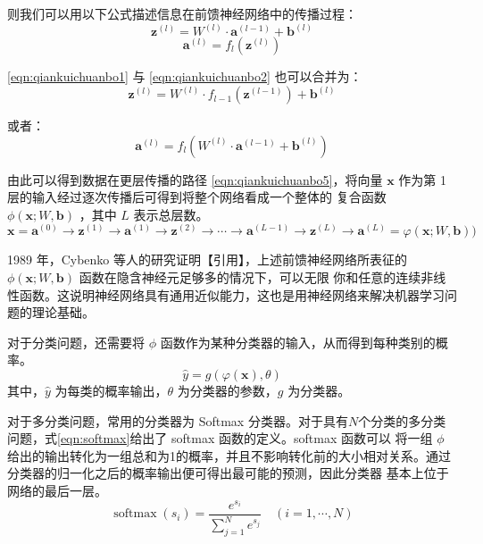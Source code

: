 则我们可以用以下公式描述信息在前馈神经网络中的传播过程：
\begin{equation}
	\label{eqn:qiankuichuanbo1}
	\mathbf { z } ^ { ( l ) } = W ^ { ( l ) } \cdot \mathbf { a } ^ { ( l - 1 ) } + \mathbf { b } ^ { ( l ) }
\end{equation}
\begin{equation}
	\label{eqn:qiankuichuanbo2}
	\mathbf { a } ^ { ( l ) } = f _ { l } \left( \mathbf { z } ^ { ( l ) } \right)
\end{equation}

\ref{eqn:qiankuichuanbo1} 与 \ref{eqn:qiankuichuanbo2} 也可以合并为：
\begin{equation}
	\label{eqn:qiankuichuanbo3}
	\mathbf { z } ^ { ( l ) } = W ^ { ( l ) } \cdot f _ { l - 1 } \left( \mathbf { z } ^ { ( l - 1 ) } \right) + \mathbf { b } ^ { ( l ) }
\end{equation}

或者：
\begin{equation}
	\label{eqn:qiankuichuanbo4}
	\mathbf { a } ^ { ( l ) } = f _ { l } \left( W ^ { ( l ) } \cdot \mathbf { a } ^ { ( l - 1 ) } + \mathbf { b } ^ { ( l ) } \right)
\end{equation}

由此可以得到数据在更层传播的路径 \ref{eqn:qiankuichuanbo5}，将向量 $\mathbf{x}$ 作为第 1 层的输入经过逐次传播后可得到将整个网络看成一个整体的
复合函数 $\phi(\mathbf{x} ; W, \mathbf{b})$
，其中 $L$ 表示总层数。
\begin{equation}
	\label{eqn:qiankuichuanbo5}
	\mathbf{x}=\mathbf{a}^{(0)} \rightarrow \mathbf{z}^{(1)} \rightarrow \mathbf{a}^{(1)} \rightarrow \mathbf{z}^{(2)} \rightarrow \cdots \rightarrow \mathbf{a}^{(L-1)} \rightarrow \mathbf{z}^{(L)} \rightarrow \mathbf{a}^{(L)}=\varphi(\mathbf{x} ; W, \mathbf{b}) )
\end{equation}

1989 年，Cybenko 等人的研究证明【引用】，上述前馈神经网络所表征的 $\phi(\mathbf{x} ; W, \mathbf{b})$ 函数在隐含神经元足够多的情况下，可以无限
你和任意的连续非线性函数。这说明神经网络具有通用近似能力，这也是用神经网络来解决机器学习问题的理论基础。

对于分类问题，还需要将 $\phi$ 函数作为某种分类器的输入，从而得到每种类别的概率。
\begin{equation} 
\hat{y}=g(\varphi(\mathbf{x}), \theta)
\end{equation}
其中，$\hat{y}$ 为每类的概率输出，$\theta$ 为分类器的参数，$g$ 为分类器。

对于多分类问题，常用的分类器为 Softmax 分类器。对于具有$N$个分类的多分类问题，式\ref{eqn:softmax}给出了 softmax 函数的定义。softmax 函数可以
将一组 $\phi$ 给出的输出转化为一组总和为1的概率，并且不影响转化前的大小相对关系。通过分类器的归一化之后的概率输出便可得出最可能的预测，因此分类器
基本上位于网络的最后一层。
\begin{equation} 
\label{eqn:softmax}
\operatorname{softmax}\left(s_{i}\right)=\frac{e^{s_{i}}}{\sum_{j=1}^{N} e^{s_{j}}} \quad(i=1, \cdots, N)
\end{equation}

